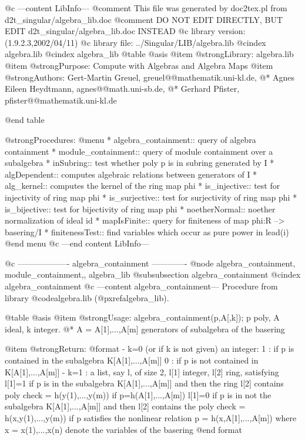 @c ---content LibInfo---
@comment This file was generated by doc2tex.pl from d2t_singular/algebra_lib.doc
@comment DO NOT EDIT DIRECTLY, BUT EDIT d2t_singular/algebra_lib.doc INSTEAD
@c library version: (1.9.2.3,2002/04/11)
@c library file: ../Singular/LIB/algebra.lib
@cindex algebra.lib
@cindex algebra_lib
@table @asis
@item @strong{Library:}
algebra.lib
@item @strong{Purpose:}
   Compute with Algebras and Algebra Maps
@item @strong{Authors:}
Gert-Martin Greuel, greuel@@mathematik.uni-kl.de,
@* Agnes Eileen Heydtmann, agnes@@math.uni-sb.de,
@* Gerhard Pfister, pfister@@mathematik.uni-kl.de

@end table

@strong{Procedures:}
@menu
* algebra_containment:: query of algebra containment
* module_containment:: query of module containment over a subalgebra
* inSubring:: test whether poly p is in subring generated by I
* algDependent:: computes algebraic relations between generators of I
* alg_kernel:: computes the kernel of the ring map phi
* is_injective:: test for injectivity of ring map phi
* is_surjective:: test for surjectivity of ring map phi
* is_bijective:: test for bijectivity of ring map phi
* noetherNormal:: noether normalization of ideal id
* mapIsFinite:: query for finiteness of map phi:R --> basering/I
* finitenessTest:: find variables which occur as pure power in lead(i)
@end menu
@c ---end content LibInfo---

@c ------------------- algebra_containment -------------
@node algebra_containment, module_containment,, algebra_lib
@subsubsection algebra_containment
@cindex algebra_containment
@c ---content algebra_containment---
Procedure from library @code{algebra.lib} (@pxref{algebra_lib}).

@table @asis
@item @strong{Usage:}
algebra_containment(p,A[,k]); p poly, A ideal, k integer.
@* A = A[1],...,A[m] generators of subalgebra of the basering

@item @strong{Return:}
@format
         - k=0 (or if k is not given) an integer:
           1  : if p is contained in the subalgebra K[A[1],...,A[m]]
           0  : if p is not contained in K[A[1],...,A[m]]
         - k=1 : a list, say l, of size 2, l[1] integer, l[2] ring, satisfying
           l[1]=1 if p is in the subalgebra K[A[1],...,A[m]] and then the ring
           l[2] contains poly check = h(y(1),...,y(m)) if p=h(A[1],...,A[m])
           l[1]=0 if p is in not the subalgebra K[A[1],...,A[m]] and then
           l[2] contains the poly check = h(x,y(1),...,y(m)) if p satisfies
           the nonlinear relation p = h(x,A[1],...,A[m]) where
           x = x(1),...,x(n) denote the variables of the basering
@end format

